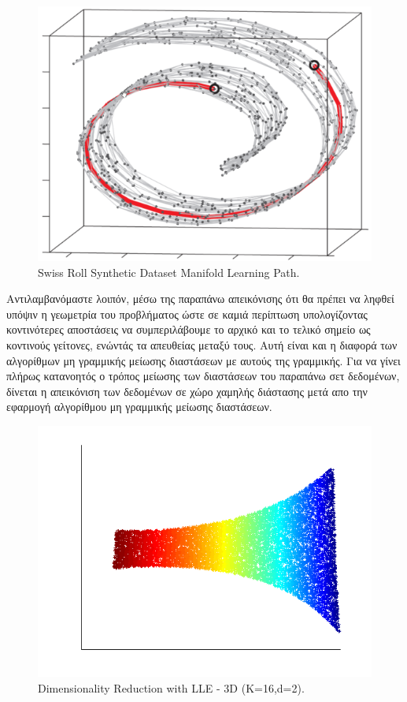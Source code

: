 \par
\begin{figure}[h!]
\centering
\includegraphics[scale=0.5]{figs/3.png}
\newline
\caption{\textlatin{Swiss Roll Synthetic Dataset Manifold Learning Path.}} 
\end{figure}
\par
\vspace*{1cm}
Αντιλαμβανόμαστε λοιπόν, μέσω της παραπάνω απεικόνισης ότι θα πρέπει να ληφθεί υπόψιν η γεωμετρία του προβλήματος ώστε σε καμιά περίπτωση υπολογίζοντας κοντινότερες αποστάσεις να συμπεριλάβουμε το αρχικό και το τελικό σημείο ως κοντινούς γείτονες, ενώντάς τα απευθείας μεταξύ τους. Αυτή είναι και η διαφορά των αλγορίθμων μη γραμμικής μείωσης διαστάσεων με αυτούς της γραμμικής. Για να γίνει πλήρως κατανοητός ο τρόπος μείωσης των διαστάσεων του παραπάνω σετ δεδομένων, δίνεται η απεικόνιση των δεδομένων σε χώρο χαμηλής διάστασης μετά απο την εφαρμογή αλγορίθμου μη γραμμικής μείωσης διαστάσεων.
\clearpage
\begin{figure}[t]
\centering
\includegraphics[scale=0.8]{figs/4.png}
\newline
\caption{\textlatin{Dimensionality Reduction with LLE - 3D (K=16,d=2).}} 
\end{figure}
